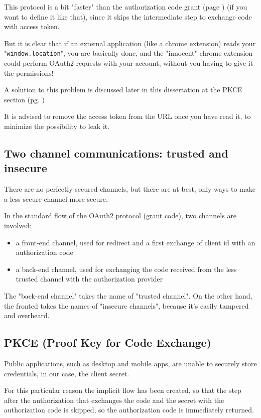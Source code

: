 This protocol is a bit "faster" than the authorization code grant (page
\pageref{sec:auth-code}) (if you want to define it like that), since it skips
the intermediate step to exchange code with access
token.

But it is clear that if an external application (like a chrome extension) reads
your "\texttt{window.location}", you are basically done, and the "innocent" chrome
extension could perform OAuth2 requests with your account, without you having to
give it the permissions!

A solution to this problem is discussed later in this dissertation at the PKCE
section (pg. \pageref{pkce})

It is advised to remove the access token from the URL once you have read it, to
minimize the possibility to leak it.

\subsection{Two channel communications: trusted and insecure}
There are no perfectly secured channels, but there are at
best, only ways to make a less secure channel more secure.

In the standard flow of the OAuth2 protocol (grant code), two channels are
involved:
\begin{itemize}
    \item a front-end channel, used for redirect and a first exchange of client
        id with an authorization code
    \item a back-end channel, used for exchanging the code received from the
        less trusted channel with the authorization provider
\end{itemize}

The "back-end channel" takes the name of "trusted channel". On the other hand,
the fronted takes the names of "insecure channels", because it's easily tampered
and overheard.

\subsection{PKCE (Proof Key for Code Exchange)}
\label{pkce}
Public applications, such as desktop and mobile apps, are unable to securely
store credentials, in our case, the client secret.

For this particular reason the implicit flow has been created, so
that the step after the authorization that exchanges the code and the secret
with the authorization code is skipped, so the authorization code is immediately
returned.

